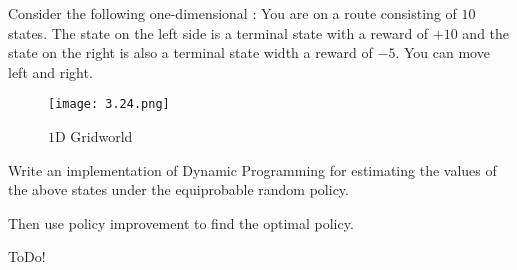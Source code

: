 
\begin{exercise}

Consider the following one-dimensional :
You are on a route consisting of $10$ states.
The state on the left side is a terminal state with a reward of $+10$ and the state on the right is also a terminal state width a reward of $-5$.
You can move left and right.

\begin{figure}[H]
    \centering
    \texttt{[image: 3.24.png]}
    \caption{$1$D Gridworld}
    \label{fig:3.24}
\end{figure}

Write an implementation of Dynamic Programming for estimating the values of the above states under the equiprobable random policy.

Then use policy improvement to find the optimal policy.

\end{exercise}


\begin{solution}

ToDo!

\end{solution}

